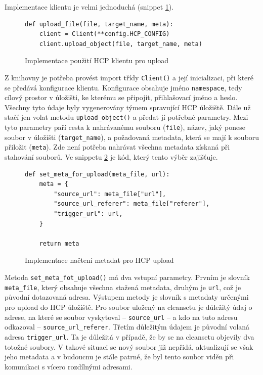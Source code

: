 \documentclass[thesis=M,czech,hidelinks]{FITthesis}[2013/05/06]
\begin{document}
Implementace klientu je velmi jednoduchá (snippet \ref{snip:hcpupload}).
\begin{figure}[h]               
	\begin{verbatim}
def upload_file(file, target_name, meta):
    client = Client(**config.HCP_CONFIG)
    client.upload_object(file, target_name, meta)
	\end{verbatim}      
	\caption{Implementace použití HCP klientu pro upload}
	\label{snip:hcpupload}
\end{figure}
Z knihovny je potřeba provést import třídy \texttt{Client()} a její inicializaci, při které se předává konfigurace klientu. Konfigurace obsahuje jméno \texttt{namespace}, tedy cílový prostor v úložišti, ke kterému se připojit, přihlašovací jméno a heslo. Všechny tyto údaje byly vygenerovány týmem spravující HCP úložiště. Dále už stačí jen volat metodu \texttt{upload_object()} a předat jí potřebné parametry. Mezi tyto parametry paří cesta k nahrávanému souboru (\texttt{file}), název, jaký ponese soubor v úložišti (\texttt{target_name}), a požadovaná metadata, která se mají k souboru přiložit (\texttt{meta}). Zde není potřeba nahrávat všechna metadata získaná při stahování souborů. Ve snippetu \ref{snip:metaupload} je kód, který tento výběr zajišťuje.

\begin{figure}[h]               
	\begin{verbatim}
def set_meta_for_upload(meta_file, url):
    meta = {
        "source_url": meta_file["url"],
        "source_url_referer": meta_file["referer"],
        "trigger_url": url,
    }
	
    return meta
	\end{verbatim}      
	\caption{Implementace načtení metadat pro HCP upload}
	\label{snip:metaupload}
\end{figure}

Metoda \texttt{set_meta_fot_upload()} má dva vstupní parametry. Prvním je slovník \texttt{meta_file}, který obsahuje všechna stažená metadata, druhým je \texttt{url}, což je původní dotazovaná adresa. Výstupem metody je slovník s metadaty určenými pro upload do HCP úložiště. Pro soubor uložený na cleansetu je důležitý údaj o adrese, na které se soubor vyskytoval – \texttt{source_url} – a kdo na tuto adresu odkazoval – \texttt{source_url_referer}. Třetím důležitým údajem je původní volaná adresa \texttt{trigger_url}. Ta je důležitá v případě, že by se na cleansetu objevily dva totožné soubory. V takové situaci se nový soubor již nepřidá, aktualizují se však jeho metadata a v budoucnu je stále patrné, že byl tento soubor viděn při komunikaci s vícero rozdílnými adresami.
\end{document}
